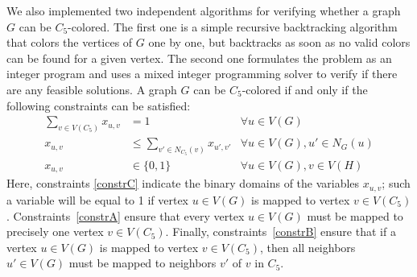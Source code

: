 \documentclass[11pt,a4paper]{article}
\theoremstyle{mystyle}
\begin{document}
We also implemented two independent algorithms for verifying whether a graph $G$ can be $C_5$-colored.
The first one is a simple recursive backtracking algorithm that colors the vertices of $G$ one by one, but backtracks as soon as no valid colors can be found for a given vertex.
The second one formulates the problem as an integer program and uses a mixed integer programming solver to verify if there are any feasible solutions. A graph $G$ can be $C_5$-colored if and only if the following constraints can be satisfied:
\begin{align}
\sum_{v \in V(C_5)}x_{u,v} &= 1 &\forall u \in V(G) \label{constrA} \\
x_{u,v} &\leq \sum_{v' \in N_{C_5}(v)} x_{u',v'} &\forall u \in V(G), u' \in N_G(u) \label{constrB}\\
x_{u,v} &\in \{0,1\} &\forall u \in V(G), v \in V(H) \label{constrC}
\end{align}
Here, constraints \eqref{constrC} indicate the binary domains of the variables $x_{u,v}$; such a variable will be equal to 1 if vertex $u \in V(G)$ is mapped to vertex $v \in V(C_5)$.
Constraints~\eqref{constrA} ensure that every vertex $u \in V(G)$ must be mapped to precisely one vertex $v \in V(C_5)$.
Finally, constraints~\eqref{constrB} ensure that if a vertex $u \in V(G)$ is mapped to vertex $v \in V(C_5)$,
then all neighbors $u' \in V(G)$ must be mapped to neighbors $v'$ of $v$ in $C_5$.
\end{document}
